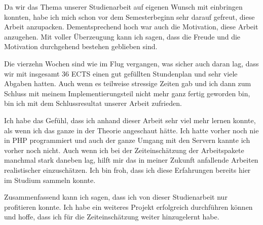 
Da wir das Thema unserer Studienarbeit auf eigenen Wunsch mit einbringen konnten, habe ich mich schon vor dem Semesterbeginn sehr darauf gefreut, diese Arbeit anzupacken. Dementsprechend hoch war auch die Motivation, diese Arbeit anzugehen. Mit voller Überzeugung kann ich sagen, dass die Freude und die Motivation  durchgehend bestehen geblieben sind. 

\bigskip

Die vierzehn Wochen sind wie im Flug vergangen, was sicher auch daran lag, dass wir mit insgesamt 36 ECTS einen gut gefüllten Stundenplan und sehr viele Abgaben hatten.
Auch wenn es teilweise stressige Zeiten gab und ich dann zum Schluss mit meinem Implementierungsteil nicht mehr ganz fertig geworden bin, bin ich mit dem Schlussresultat unserer Arbeit zufrieden.

\bigskip

Ich habe das Gefühl, dass ich anhand dieser Arbeit sehr viel mehr lernen konnte, als wenn ich das ganze in der Theorie angeschaut hätte. Ich hatte vorher noch nie in PHP programmiert und auch der ganze Umgang mit den Servern kannte ich vorher noch nicht. Auch wenn ich bei der Zeiteinschätzung der Arbeitspakete manchmal stark daneben lag, hilft mir das in meiner Zukunft anfallende Arbeiten realistischer einzuschätzen. Ich bin froh, dass ich diese Erfahrungen bereits hier im Studium sammeln konnte.

\bigskip
Zusammenfassend kann ich sagen, dass ich von dieser Studienarbeit nur profitieren konnte. Ich habe ein weiteres Projekt erfolgreich durchführen können und hoffe, dass ich für die Zeiteinschätzung weiter hinzugelernt habe.
